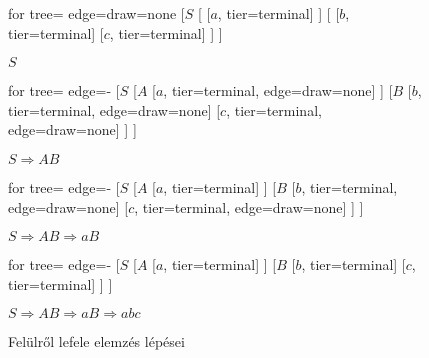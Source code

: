 \begin{figure}[h!]
	\centering
\begin{minipage}{0.2\linewidth}
	\begin{center}
		\begin{forest}
			for tree={ edge={draw=none}}
			[$S$
			[$ $
			[$a$, tier=terminal]
			]
			[$ $
			[$b$, tier=terminal]
			[$c$, tier=terminal]
			]
			]
		\end{forest}
		
		$S$
	\end{center}
\end{minipage}
\begin{minipage}{0.2\linewidth}
	\begin{center}
		\begin{forest}
			for tree={ edge={-}}
			[$S$
			[$A$
			[$a$, tier=terminal, edge={draw=none}]
			]
			[$B$
			[$b$, tier=terminal, edge={draw=none}]
			[$c$, tier=terminal, edge={draw=none}]
			]
			]
		\end{forest}
		
		$S \Rightarrow AB$
	\end{center}
\end{minipage}
\begin{minipage}{0.2\linewidth}
	\begin{center}
		\begin{forest}
			for tree={ edge={-}}
			[$S$
			[$A$
			[$a$, tier=terminal]
			]
			[$B$
			[$b$, tier=terminal, edge={draw=none}]
			[$c$, tier=terminal, edge={draw=none}]
			]
			]
		\end{forest}
		
		$S \Rightarrow AB \Rightarrow aB$
	\end{center}
\end{minipage}
\begin{minipage}{0.30\linewidth}
	\begin{center}
		\begin{forest}
			for tree={ edge={-}}
			[$S$
			[$A$
			[$a$, tier=terminal]
			]
			[$B$
			[$b$, tier=terminal]
			[$c$, tier=terminal]
			]
			]
		\end{forest}
		
		$S \Rightarrow AB \Rightarrow aB \Rightarrow abc$
	\end{center}
\end{minipage}
	\caption{Felülről lefele elemzés lépései}
\end{figure}


